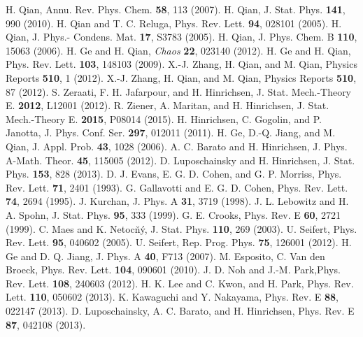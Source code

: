 \documentclass[aps,pre,amsmath,amssymb,floatfix,preprint,nofootinbib]{revtex4}
\begin{document}
\begin{thebibliography}{}
  H. Qian,  Annu. Rev. Phys. Chem. \textbf{58}, 113 (2007).
H. Qian, J. Stat. Phys. \textbf{141}, 990 (2010).
 H. Qian and  T. C. Reluga, Phys. Rev. Lett. \textbf{94}, 028101 (2005).
 H. Qian, J. Phys.- Condens. Mat. \textbf{17}, S3783 (2005).
 H. Qian, J. Phys. Chem. B \textbf{110}, 15063 (2006).
 H. Ge and H. Qian,  {\it Chaos} \textbf{22}, 023140 (2012).
 H. Ge and H. Qian, Phys. Rev. Lett. \textbf{103}, 148103 (2009).
X.-J. Zhang, H. Qian, and M. Qian, Physics Reports \textbf{510}, 1 (2012). 
X.-J. Zhang, H. Qian, and M. Qian, Physics Reports \textbf{510}, 87 (2012). 
S. Zeraati, F. H. Jafarpour, and  H. Hinrichsen, J. Stat. Mech.-Theory E. \textbf{2012}, L12001 (2012).
R. Ziener, A. Maritan, and H. Hinrichsen, J. Stat. Mech.-Theory E. \textbf{2015}, P08014 (2015).
H. Hinrichsen, C. Gogolin, and P. Janotta, J. Phys. Conf. Ser.  \textbf{297}, 012011 (2011).
H. Ge, D.-Q. Jiang, and M. Qian, J. Appl. Prob. \textbf{43}, 1028 (2006).
A. C. Barato and H. Hinrichsen, J. Phys. A-Math. Theor. \textbf{45},  115005 (2012).
D. Luposchainsky and H. Hinrichsen, J. Stat. Phys. \textbf{153},  828 (2013).
 D. J. Evans,  E. G. D. Cohen, and G. P. Morriss,  Phys. Rev. Lett. \textbf{71}, 2401 (1993).
  G. Gallavotti and E. G. D. Cohen,  Phys. Rev. Lett.  \textbf{74}, 2694 (1995).
 J. Kurchan, J. Phys. A \textbf{31}, 3719 (1998).
 J. L. Lebowitz and H. A.  Spohn,  J. Stat. Phys. \textbf{95}, 333 (1999).
 G. E. Crooks, Phys. Rev. E \textbf{60}, 2721 (1999).
 C. Maes and  K. Netoc\u n\'y, J. Stat. Phys. \textbf{110}, 269 (2003).
U. Seifert,  Phys. Rev. Lett. \textbf{95}, 040602 (2005).
U. Seifert, Rep. Prog. Phys. \textbf{75}, 126001 (2012).
 H. Ge and D. Q. Jiang,  J. Phys. A \textbf{40},  F713 (2007).
 M. Esposito, C. Van den Broeck, Phys. Rev. Lett. \textbf{104}, 090601 (2010).
 J. D. Noh and J.-M. Park,Phys. Rev. Lett. \textbf{108}, 240603 (2012).
 H. K. Lee and  C. Kwon, and H. Park, Phys. Rev. Lett. \textbf{110}, 050602 (2013).
  K. Kawaguchi and Y. Nakayama,  Phys. Rev. E \textbf{88}, 022147 (2013).
  D. Luposchainsky, A. C. Barato, and H. Hinrichsen,  Phys. Rev. E \textbf{87}, 042108 (2013).

\end{thebibliography}
\end{document}
